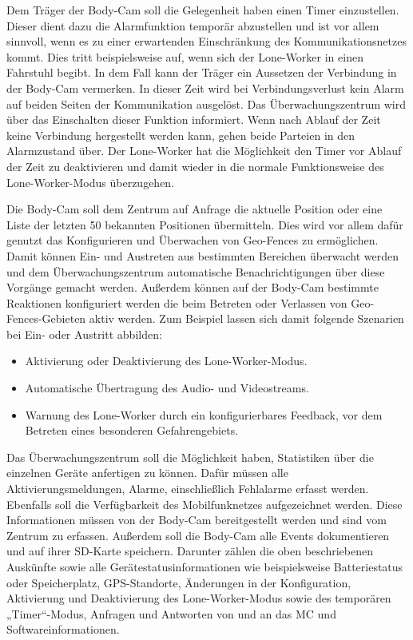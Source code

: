 \documentclass[thesis.tex]{subfiles}
\begin{document}
Dem Träger der Body-Cam soll die Gelegenheit haben einen \glqq Timer\grqq{} einzustellen.
Dieser dient dazu die Alarmfunktion temporär abzustellen und ist vor allem sinnvoll, wenn es zu einer erwartenden Einschränkung des Kommunikationsnetzes kommt.
Dies tritt beispielsweise auf, wenn sich der Lone-Worker in einen Fahrstuhl begibt.
In dem Fall kann der Träger ein Aussetzen der Verbindung in der Body-Cam vermerken.
In dieser Zeit wird bei Verbindungsverlust kein Alarm auf beiden Seiten der Kommunikation ausgelöst.
Das Überwachungszentrum wird über das Einschalten dieser Funktion informiert.
Wenn nach Ablauf der Zeit keine Verbindung hergestellt werden kann, gehen beide Parteien in den Alarmzustand über.
Der Lone-Worker hat die Möglichkeit den Timer vor Ablauf der Zeit zu deaktivieren und damit wieder in die normale Funktionsweise des Lone-Worker-Modus überzugehen.

Die Body-Cam soll dem Zentrum auf Anfrage die aktuelle Position oder eine Liste der letzten 50 bekannten Positionen übermitteln.
Dies wird vor allem dafür genutzt das Konfigurieren und Überwachen von \glqq Geo-Fences\grqq{} zu ermöglichen.
Damit können Ein- und Austreten aus bestimmten Bereichen überwacht werden und dem Überwachungszentrum automatische Benachrichtigungen
über diese Vorgänge gemacht werden.
Außerdem können auf der Body-Cam bestimmte Reaktionen konfiguriert werden die beim Betreten oder Verlassen von \glqq Geo-Fences\grqq{}-Gebieten aktiv werden.
Zum Beispiel lassen sich damit folgende Szenarien bei Ein- oder Austritt abbilden:
\begin{itemize}
    \item Aktivierung oder Deaktivierung des Lone-Worker-Modus.
    \item Automatische Übertragung des Audio- und Videostreams.
    \item Warnung des Lone-Worker durch ein konfigurierbares Feedback, vor dem Betreten eines besonderen Gefahrengebiets.
\end{itemize}

Das Überwachungszentrum soll die Möglichkeit haben, Statistiken über die einzelnen Geräte anfertigen zu können.
Dafür müssen alle Aktivierungsmeldungen, Alarme, einschließlich Fehlalarme erfasst werden.
Ebenfalls soll die Verfügbarkeit des Mobilfunknetzes aufgezeichnet werden.
Diese Informationen müssen von der Body-Cam bereitgestellt werden und sind vom Zentrum zu erfassen.
Außerdem soll die Body-Cam alle Events dokumentieren und auf ihrer SD-Karte speichern.
Darunter zählen die oben beschriebenen Auskünfte sowie alle Gerätestatusinformationen wie beispielsweise Batteriestatus
oder Speicherplatz, GPS-Standorte, Änderungen in der Konfiguration, Aktivierung und Deaktivierung des Lone-Worker-Modus
sowie des temporären „Timer“-Modus, Anfragen und Antworten von und an das MC und Softwareinformationen.
\end{document}
